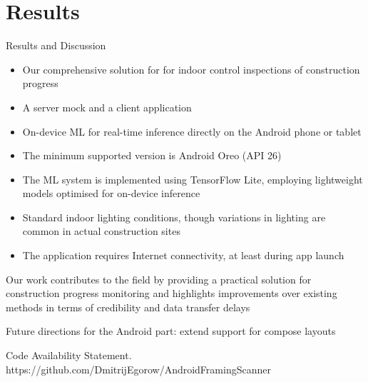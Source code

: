 \documentclass{beamer}%
\begin{document}
\section[Results]{Results}
\begin{frame}{Results and Discussion}
\begin{changemargin}
\footnotesize

\begin{itemize}
\item<1-> Our comprehensive solution for for indoor control inspections of construction progress
\item<1-> A server mock and a client application
\item<1-> On-device ML for real-time inference directly on the Android phone or tablet
\item<1-> The minimum supported version is Android Oreo (API 26)
\item<1-> The ML system is implemented using TensorFlow Lite, employing lightweight models optimised for on-device inference
\item<1-> Standard indoor lighting conditions, though variations in lighting are common in actual construction sites
\item<1-> The application requires Internet connectivity, at least during app launch
\end{itemize}

\vspace{1.5ex} Our work contributes to the field by providing a practical solution for construction progress monitoring and highlights improvements over existing methods in terms of credibility and data transfer delays \vspace{1.2ex}

Future directions for the Android part: extend support for compose layouts

\vspace{1.10ex} Code Availability Statement. https://github.com/DmitrijEgorow/AndroidFramingScanner




\end{changemargin}
\end{frame}
\end{document}
